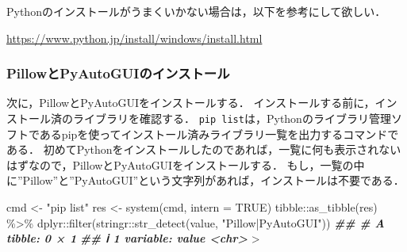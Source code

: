 \documentclass[
]{article}
\newenvironment{Shaded}{\begin{snugshade}}{\end{snugshade}}
\newcommand{\AttributeTok}[1]{\textcolor[rgb]{0.77,0.63,0.00}{#1}}
\newcommand{\ConstantTok}[1]{\textcolor[rgb]{0.00,0.00,0.00}{#1}}
\newcommand{\DocumentationTok}[1]{\textcolor[rgb]{0.56,0.35,0.01}{\textbf{\textit{#1}}}}
\newcommand{\FunctionTok}[1]{\textcolor[rgb]{0.00,0.00,0.00}{#1}}
\newcommand{\NormalTok}[1]{#1}
\newcommand{\OtherTok}[1]{\textcolor[rgb]{0.56,0.35,0.01}{#1}}
\newcommand{\SpecialCharTok}[1]{\textcolor[rgb]{0.00,0.00,0.00}{#1}}
\newcommand{\StringTok}[1]{\textcolor[rgb]{0.31,0.60,0.02}{#1}}
\begin{document}
Pythonのインストールがうまくいかない場合は，以下を参考にして欲しい．

\url{https://www.python.jp/install/windows/install.html}

\hypertarget{pillowux3068pyautoguiux306eux30a4ux30f3ux30b9ux30c8ux30fcux30eb}{%
\subsubsection{PillowとPyAutoGUIのインストール}\label{pillowux3068pyautoguiux306eux30a4ux30f3ux30b9ux30c8ux30fcux30eb}}

次に，PillowとPyAutoGUIをインストールする．
インストールする前に，インストール済のライブラリを確認する．
\texttt{pip\ list}は，Pythonのライブラリ管理ソフトであるpipを使ってインストール済みライブラリ一覧を出力するコマンドである．
初めてPythonをインストールしたのであれば，一覧に何も表示されないはずなので，PillowとPyAutoGUIをインストールする．
もし，一覧の中に''Pillow''と''PyAutoGUI''という文字列があれば，インストールは不要である．

\begin{Shaded}
\begin{Highlighting}[]
\NormalTok{cmd }\OtherTok{\textless{}{-}} \StringTok{"pip list"}
\NormalTok{res }\OtherTok{\textless{}{-}} \FunctionTok{system}\NormalTok{(cmd, }\AttributeTok{intern =} \ConstantTok{TRUE}\NormalTok{)}
\NormalTok{tibble}\SpecialCharTok{::}\FunctionTok{as\_tibble}\NormalTok{(res) }\SpecialCharTok{\%\textgreater{}\%}
\NormalTok{  dplyr}\SpecialCharTok{::}\FunctionTok{filter}\NormalTok{(stringr}\SpecialCharTok{::}\FunctionTok{str\_detect}\NormalTok{(value, }\StringTok{"Pillow|PyAutoGUI"}\NormalTok{))}
\DocumentationTok{\#\# \# A tibble: 0 × 1}
\DocumentationTok{\#\# ℹ 1 variable: value \textless{}chr\textgreater{}}
\SpecialCharTok{\textgreater{}} 
\end{Highlighting}
\end{Shaded}
\end{document}
